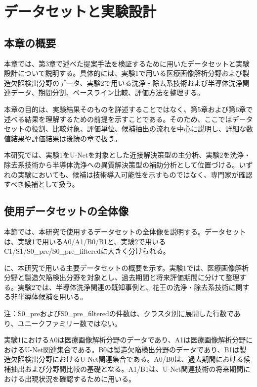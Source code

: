 \chapter{データセットと実験設計}

\section{本章の概要}

本章では、第3章で述べた提案手法を検証するために用いたデータセットと実験設計について説明する。具体的には、実験1で用いる医療画像解析分野および製造欠陥検出分野のデータ、実験2で用いる洗浄・除去系技術および半導体洗浄関連データ、期間分割、ベースライン比較、評価方法を整理する。

本章の目的は、実験結果そのものを詳述することではなく、第5章および第6章で述べる結果を理解するための前提を示すことである。そのため、ここではデータセットの役割、比較対象、評価単位、候補抽出の流れを中心に説明し、詳細な数値結果や評価結果は後続の章で扱う。

本研究では、実験1をU-Netを対象とした近接解決策型の主分析、実験2を洗浄・除去系技術から半導体洗浄への異質解決策型の補助分析として位置づける。いずれの実験においても、候補は技術導入可能性を示すものではなく、専門家が確認すべき候補として扱う。

\section{使用データセットの全体像}




本節では、本研究で使用するデータセットの全体像を説明する。データセットは、実験1で用いるA0/A1/B0/B1と、実験2で用いるC1/S1/S0\_pre/S0\_pre\_filteredに大きく分けられる。

に、本研究で用いる主要データセットの概要を示す。実験1では、医療画像解析分野と製造欠陥検出分野を対象とし、過去期間と将来評価期間に分けて整理する。実験2では、半導体洗浄関連の既知事例と、花王の洗浄・除去系技術に関する非半導体候補を用いる。

注：S0\_preおよびS0\_pre\_filteredの件数は、クラスタ別に展開した行数であり、ユニークファミリー数ではない。

実験1におけるA0は医療画像解析分野のデータであり、A1は医療画像解析分野におけるU-Net関連集合である。B0は製造欠陥検出分野のデータであり、B1は製造欠陥検出分野におけるU-Net関連集合である。A0/B0は、過去期間における候補抽出および分野間比較の基礎となる。A1/B1は、U-Net関連技術の将来期間における出現状況を確認するために用いる。

